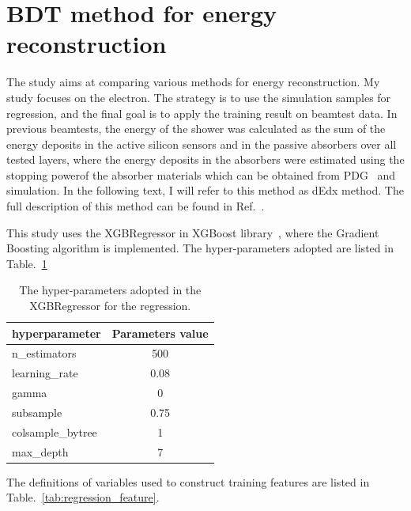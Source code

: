 \section{BDT method for energy reconstruction}
\label{sec:energyreconstruction}
The study aims at comparing various methods for energy reconstruction. My study focuses on the electron. The strategy is to use the simulation samples for regression, and the final goal is to apply the training result on beamtest data.
In previous beamtests, the energy of the shower was calculated as the sum of the energy deposits in the active silicon sensors and in the passive absorbers over all tested layers, where the energy deposits in the absorbers were estimated using the stopping power\footnotemark of the absorber materials which can be obtained from PDG~\cite{PhysRevD.98.030001} and simulation. 
In the following text, I will refer to this method as dEdx method. The full description of this method can be found in Ref.~\cite{1748-0221-13-10-P10023}. 


This study uses the XGBRegressor in XGBoost library~\cite{XGBoost-Documentation}, where the Gradient Boosting algorithm is implemented. The hyper-parameters adopted are listed in Table.~\ref{tab:hyperparam}

\begin{table}[!ht]
  \begin{center}
    {
    \begin{tabular}{lc}
    	hyperparameter & Parameters value\\
    	\hline
    	n\_estimators & 500 \\
    	learning\_rate & 0.08 \\
    	gamma & 0 \\
    	subsample & 0.75 \\
    	colsample\_bytree & 1 \\
    	max\_depth & 7 \\
    \end{tabular}
    }
  \end{center}
  \caption{The hyper-parameters adopted in the XGBRegressor for the regression.  \label{tab:hyperparam}}
\end{table}

The definitions of variables used to construct training features are listed in Table.~\ref{tab:regression_feature}.


